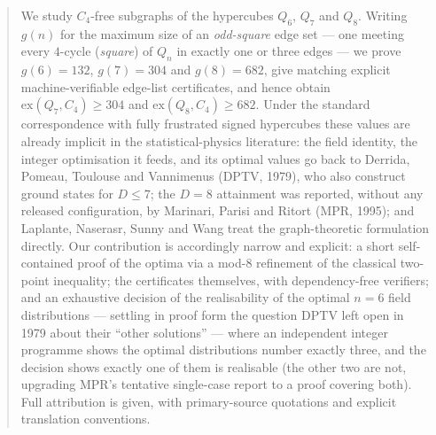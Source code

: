 \documentclass[12pt,a4paper]{article}
\theoremstyle{definition}
\newcommand{\ex}{\mathrm{ex}}
\begin{document}
\begin{abstract}
We study $C_4$-free subgraphs of the hypercubes $Q_6$, $Q_7$ and $Q_8$.
Writing $g(n)$ for the maximum size of an \emph{odd-square} edge set ---
one meeting every $4$-cycle (\emph{square}) of $Q_n$ in exactly one or
three edges --- we prove $g(6)=132$, $g(7)=304$ and $g(8)=682$, give
matching explicit machine-verifiable edge-list certificates, and hence
obtain $\ex(Q_7,C_4)\ge304$ and $\ex(Q_8,C_4)\ge682$. Under the standard
correspondence with fully frustrated signed hypercubes these values are
already implicit in the statistical-physics literature: the field
identity, the integer optimisation it feeds, and its optimal values go
back to Derrida, Pomeau, Toulouse and Vannimenus (DPTV, 1979), who also
construct ground states for $D\le7$; the $D=8$ attainment was reported,
without any released configuration, by Marinari, Parisi and Ritort
(MPR, 1995); and Laplante, Naserasr, Sunny and Wang treat the graph-theoretic
formulation directly. Our contribution is accordingly narrow and
explicit: a short self-contained proof of the optima via a mod-$8$
refinement of the classical two-point inequality; the certificates
themselves, with dependency-free verifiers; and an exhaustive decision of the realisability of the optimal $n=6$
field distributions --- settling in proof form the question DPTV left open in 1979
about their ``other solutions'' --- where an independent integer
programme shows the optimal distributions number exactly three, and the
decision shows exactly one of them is realisable (the other two are not,
upgrading MPR's tentative single-case report to a proof covering both). Full attribution is given, with primary-source quotations and explicit
translation conventions.


\end{abstract}
\end{document}
